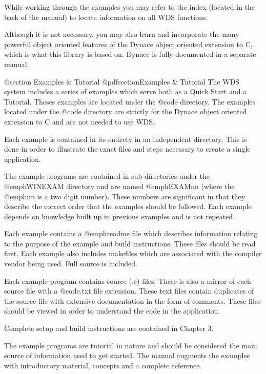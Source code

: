 While working through the examples you may refer to the index (located
in the back of the manual) to locate information on all WDS functions.

Although it is not necessary, you may also learn and incorporate the
many powerful object oriented features of the Dynace object oriented
extension to C, which is what this library is based on.  Dynace is fully
documented in a separate manual.






@section Examples & Tutorial
@pdfsection{Examples & Tutorial}
The WDS system includes a series of examples which serve both as a Quick
Start and a Tutorial.  Theses examples are located under the
@code{\DYNACE\WINEXAM} directory.  The examples located under the
@code{\DYNACE\EXAMPLES} directory are strictly for the Dynace object
oriented extension to C and are not needed to use WDS.

Each example is contained in its entirety in an independent directory.
This is done in order to illustrate the exact files and steps necessary
to create a single application.

The example programs are contained in sub-directories under the
@emph{WINEXAM} directory and are named @emph{EXAMnn} (where the
@emph{nn} is a two digit number).  These numbers are significant in that
they describe the correct order that the examples should be followed.
Each example depends on knowledge built up in previous examples and is
not repeated.

Each example contains a @emph{readme} file which describes information
relating to the purpose of the example and build instructions.  These
files should be read first.  Each example also includes makefiles which
are associated with the compiler vendor being used.  Full source is
included.

Each example program contains source (.c) files.  There is also a mirror
of each source file with a @code{.txt} file extension.  These text files
contain duplicates of the source file with extensive documentation in
the form of comments.  These files should be viewed in order to
understand the code in the application.

Complete setup and build instructions are contained in Chapter 3.

The example programs are tutorial in nature and should be considered the
main source of information used to get started.  The manual augments the
examples with introductory material, concepts and a complete reference.

